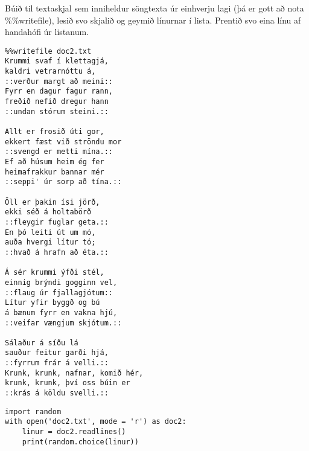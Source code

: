 \begin{exercise}\label{doc2}
Búið til textaskjal sem inniheldur söngtexta úr einhverju lagi (þá er gott að nota \%\%writefile), lesið svo skjalið og geymið línurnar í lista.
Prentið svo eina línu af handahófi úr listanum.
\end{exercise}
\begin{Answer}[ref={doc2}]
	\begin{lstlisting}
%%writefile doc2.txt
Krummi svaf í klettagjá,
kaldri vetrarnóttu á,
::verður margt að meini::
Fyrr en dagur fagur rann,
freðið nefið dregur hann
::undan stórum steini.::

Allt er frosið úti gor,
ekkert fæst við ströndu mor
::svengd er metti mína.::
Ef að húsum heim ég fer
heimafrakkur bannar mér
::seppi' úr sorp að tína.::

Öll er þakin ísi jörð,
ekki séð á holtabörð
::fleygir fuglar geta.::
En þó leiti út um mó,
auða hvergi lítur tó;
::hvað á hrafn að éta.::

Á sér krummi ýfði stél,
einnig brýndi gogginn vel,
::flaug úr fjallagjótum::
Lítur yfir byggð og bú
á bænum fyrr en vakna hjú,
::veifar vængjum skjótum.::

Sálaður á síðu lá
sauður feitur garði hjá,
::fyrrum frár á velli.::
Krunk, krunk, nafnar, komið hér,
krunk, krunk, því oss búin er
::krás á köldu svelli.::		
\end{lstlisting}
	\begin{lstlisting}
import random 
with open('doc2.txt', mode = 'r') as doc2:
	linur = doc2.readlines()
	print(random.choice(linur))
\end{lstlisting}
\end{Answer}
